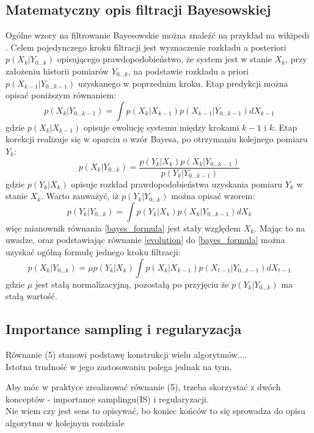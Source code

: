 \documentclass[10pt,a4paper]{article}
\begin{document}
\subsection{Matematyczny opis filtracji Bayesowskiej}
Ogólne wzory na filtrowanie Bayesowskie można znaleźć na przykład na wikipedi \cite{wiki_bayes_filter}. Celem pojedynczego kroku filtracji jest wyznaczenie rozkładu a posteriori $p(X_{k}|Y_{0...k})$ opisującego prawdopodobieństwo, że system jest w stanie $X_k$, przy założeniu historii pomiarów $Y_{0...k}$, na podstawie rozkładu a priori $p(X_{k-1}|Y_{0...k-1})$ uzyskanego w poprzednim kroku. Etap predykcji można opisać poniższym równaniem:
\begin{equation} \label{evolution}
	p(X_k|Y_{0...k-1})=\int p(X_k|X_{k-1})p(X_{k-1}|Y_{0...k-1}) dX_{k-1}
\end{equation}
gdzie $p(X_k|X_{k-1})$ opisuje ewolucję systemu między krokami $k-1$ i $k$. Etap korekcji realizuje się w oparciu o wzór Bayesa, po otrzymaniu kolejnego pomiaru $Y_k$:
\begin{equation}\label{bayes_formula}
	p(X_k|Y_{0...k})=\frac{p(Y_k|X_k)p(X_k|Y_{0...k-1})}{p(Y_k|Y_{0...k-1})}
\end{equation}
gdzie $p(Y_k|X_k)$ opisuje rozkład prawdopodobieństwa uzyskania pomiaru $Y_k$ w stanie $X_k$. Warto zauważyć, iż $p(Y_k|Y_{0...k})$ można opisać wzorem:
\begin{equation}
p(Y_k|Y_{0...k})=\int p(Y_k|X_k)p(X_k|Y_{0...k-1}) dX_k
\end{equation}
więc mianownik równania \ref{bayes_formula} jest stały względem $X_k$. Mając to na uwadze, oraz podstawiając równanie \ref{evolution} do \ref{bayes_formula} można uzyskać ogólną formułę jednego kroku filtracji:
\begin{equation}
	p(X_k|Y_{0...k})=\mu p(Y_k|X_k)\int p(X_k|X_{k-1})p(X_{t-1}|Y_{0...t-1}) dX_{t-1}
\end{equation}
gdzie $\mu$ jest stałą normalizacyjną, pozostałą po przyjęciu że $p(Y_k|Y_{0...k})$ ma stałą wartość.
\subsection{Importance sampling i regularyzacja}
Równanie (5) stanowi podstawę konstrukcji wielu algorytmów....\\
Istotna trudność w jego zastosowaniu polega jednak na tym, 

Aby móc w praktyce zrealizować równanie (5), trzeba skorzystać z dwóch konceptów - importance samplingu(IS) i regularyzacji. \\
Nie wiem czy jest sens to opisywać, bo koniec końców to się sprowadza do opisu algorytmu w kolejnym rozdziale
\end{document}

